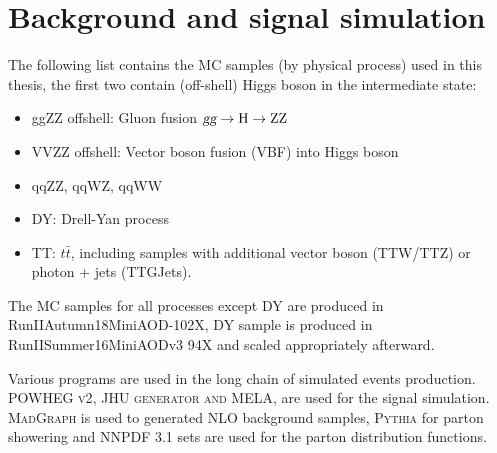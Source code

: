 

\section{Background and signal simulation}




The following list contains the MC samples (by physical process) used in this thesis, the first two
contain (off-shell) Higgs boson in the intermediate state:
\begin{itemize}
\item ggZZ offshell: Gluon fusion $\textsl{g}\textsl{g} \rightarrow\mathrm{H}\rightarrow\mathrm{ZZ}$
\item VVZZ offshell: Vector boson fusion (VBF) into Higgs boson
\item qqZZ, qqWZ, qqWW
\item DY: Drell-Yan process
\item TT: $t\bar{t}$, including samples with additional vector boson (TTW/TTZ) or photon + jets (TTGJets).
\end{itemize}

The MC samples for all processes except DY are produced in RunIIAutumn18MiniAOD-102X,
DY sample is produced in RunIISummer16MiniAODv3 94X and scaled appropriately afterward. 

Various programs are used in the long chain of simulated events production.
\textsc{POWHEG v2}\xspace\cite{powhegv2}, \textsc{JHU generator and MELA}\xspace\cite{jhugen}, are used for 
the signal simulation.
\textsc{MadGraph}\xspace\cite{madgraph} is used to generated NLO background samples, 
\textsc{Pythia}\xspace\cite{pythia} for parton
showering and \textsc{NNPDF} 3.1\cite{nnpdf} sets are used for the parton distribution functions.

